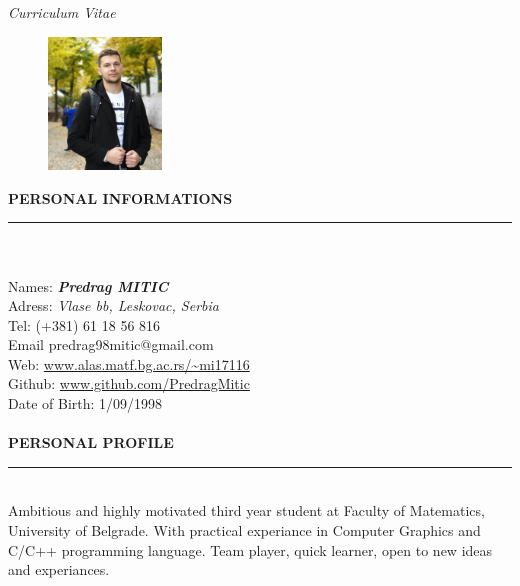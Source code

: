\documentclass{article}
\begin{document}
\begin{center}
	\textit{\Huge Curriculum Vitae}   
	\vspace*{1cm}
\end{center}

\begin{figure} 
	\includegraphics[width=0.27\textwidth]{my_pic.jpeg}
\end{figure}

\textbf{\large PERSONAL INFORMATIONS}\\
\color{my_col}\noindent\rule{10cm}{0.8pt}\color{black}\\ \\
Names:  \textbf{\emph{Predrag MITIC}} \\
Adress: \emph{Vlase bb, Leskovac, Serbia }\\
Tel: 	(+381) 61 18 56 816 \\
Email	predrag98mitic@gmail.com \\ 
Web:	\url{www.alas.matf.bg.ac.rs/~mi17116} \\
Github:	\url{www.github.com/PredragMitic} \\ 
Date of Birth: 1/09/1998 \\ \\

\textbf{\large PERSONAL PROFILE}\\
\color{my_col}\noindent\rule{15.4cm}{0.6pt}\color{black}\\ 
Ambitious and highly motivated third year student at Faculty of Matematics, 
University of Belgrade. With practical experiance in Computer Graphics and 
C/C++ programming language. Team player, quick learner, open to new ideas and experiances.\\
\end{document}
